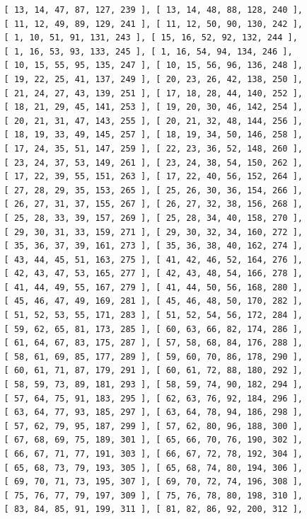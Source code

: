 \documentclass{article}
\begin{document}
\begin{verbatim}
          [ 13, 14, 47, 87, 127, 239 ], [ 13, 14, 48, 88, 128, 240 ], 
          [ 11, 12, 49, 89, 129, 241 ], [ 11, 12, 50, 90, 130, 242 ], 
          [ 1, 10, 51, 91, 131, 243 ], [ 15, 16, 52, 92, 132, 244 ], 
          [ 1, 16, 53, 93, 133, 245 ], [ 1, 16, 54, 94, 134, 246 ], 
          [ 10, 15, 55, 95, 135, 247 ], [ 10, 15, 56, 96, 136, 248 ], 
          [ 19, 22, 25, 41, 137, 249 ], [ 20, 23, 26, 42, 138, 250 ], 
          [ 21, 24, 27, 43, 139, 251 ], [ 17, 18, 28, 44, 140, 252 ], 
          [ 18, 21, 29, 45, 141, 253 ], [ 19, 20, 30, 46, 142, 254 ], 
          [ 20, 21, 31, 47, 143, 255 ], [ 20, 21, 32, 48, 144, 256 ], 
          [ 18, 19, 33, 49, 145, 257 ], [ 18, 19, 34, 50, 146, 258 ], 
          [ 17, 24, 35, 51, 147, 259 ], [ 22, 23, 36, 52, 148, 260 ], 
          [ 23, 24, 37, 53, 149, 261 ], [ 23, 24, 38, 54, 150, 262 ], 
          [ 17, 22, 39, 55, 151, 263 ], [ 17, 22, 40, 56, 152, 264 ], 
          [ 27, 28, 29, 35, 153, 265 ], [ 25, 26, 30, 36, 154, 266 ], 
          [ 26, 27, 31, 37, 155, 267 ], [ 26, 27, 32, 38, 156, 268 ], 
          [ 25, 28, 33, 39, 157, 269 ], [ 25, 28, 34, 40, 158, 270 ], 
          [ 29, 30, 31, 33, 159, 271 ], [ 29, 30, 32, 34, 160, 272 ], 
          [ 35, 36, 37, 39, 161, 273 ], [ 35, 36, 38, 40, 162, 274 ], 
          [ 43, 44, 45, 51, 163, 275 ], [ 41, 42, 46, 52, 164, 276 ], 
          [ 42, 43, 47, 53, 165, 277 ], [ 42, 43, 48, 54, 166, 278 ], 
          [ 41, 44, 49, 55, 167, 279 ], [ 41, 44, 50, 56, 168, 280 ], 
          [ 45, 46, 47, 49, 169, 281 ], [ 45, 46, 48, 50, 170, 282 ], 
          [ 51, 52, 53, 55, 171, 283 ], [ 51, 52, 54, 56, 172, 284 ], 
          [ 59, 62, 65, 81, 173, 285 ], [ 60, 63, 66, 82, 174, 286 ], 
          [ 61, 64, 67, 83, 175, 287 ], [ 57, 58, 68, 84, 176, 288 ], 
          [ 58, 61, 69, 85, 177, 289 ], [ 59, 60, 70, 86, 178, 290 ], 
          [ 60, 61, 71, 87, 179, 291 ], [ 60, 61, 72, 88, 180, 292 ], 
          [ 58, 59, 73, 89, 181, 293 ], [ 58, 59, 74, 90, 182, 294 ], 
          [ 57, 64, 75, 91, 183, 295 ], [ 62, 63, 76, 92, 184, 296 ], 
          [ 63, 64, 77, 93, 185, 297 ], [ 63, 64, 78, 94, 186, 298 ], 
          [ 57, 62, 79, 95, 187, 299 ], [ 57, 62, 80, 96, 188, 300 ], 
          [ 67, 68, 69, 75, 189, 301 ], [ 65, 66, 70, 76, 190, 302 ], 
          [ 66, 67, 71, 77, 191, 303 ], [ 66, 67, 72, 78, 192, 304 ], 
          [ 65, 68, 73, 79, 193, 305 ], [ 65, 68, 74, 80, 194, 306 ], 
          [ 69, 70, 71, 73, 195, 307 ], [ 69, 70, 72, 74, 196, 308 ], 
          [ 75, 76, 77, 79, 197, 309 ], [ 75, 76, 78, 80, 198, 310 ], 
          [ 83, 84, 85, 91, 199, 311 ], [ 81, 82, 86, 92, 200, 312 ], 

\end{verbatim}
\end{document}
